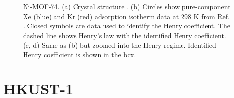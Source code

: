     \begin{figure}[h!]
       \centering
  
       
       \caption{Ni-MOF-74. (a) Crystal structure \cite{Ni-MOF-74_structure}.
       (b) Circles show pure-component Xe (blue) and Kr (red) adsorption isotherm data at 298 K from Ref. \cite{Ni-MOF-74_XeKr}. 
       Closed symbols are data used to identify the Henry coefficient. The dashed line shows Henry's law with the identified Henry coefficient.
       (c, d) Same as (b) but zoomed into the Henry regime. Identified Henry coefficient is shown in the box.}
    \end{figure}
    
    \clearpage
    
    
    \section{HKUST-1}
    
